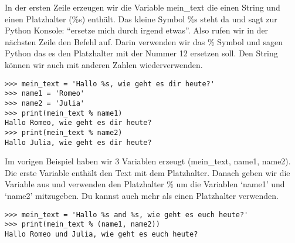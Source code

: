 In der ersten Zeile erzeugen wir die Variable mein\_text die einen String und einen Platzhalter (\%s) enthält. Das kleine Symbol \%s steht da und sagt zur Python Konsole: ``ersetze mich durch irgend etwas''. Also rufen wir in der nächsten Zeile den  Befehl auf. Darin verwenden wir das \% Symbol und sagen Python das es den Platzhalter mit der Nummer 12 ersetzen soll. Den String können wir auch mit anderen Zahlen wiederverwenden.

\begin{Verbatim}[frame=single]
>>> mein_text = 'Hallo %s, wie geht es dir heute?'
>>> name1 = 'Romeo'
>>> name2 = 'Julia'
>>> print(mein_text % name1)
Hallo Romeo, wie geht es dir heute?
>>> print(mein_text % name2)
Hallo Julia, wie geht es dir heute?
\end{Verbatim}

Im vorigen Beispiel haben wir 3 Variablen erzeugt (mein\_text, name1, name2). Die erste Variable enthält den Text mit dem Platzhalter. Danach geben wir die Variable aus und verwenden den Platzhalter \% um die Variablen `name1' und `name2' mitzugeben. Du kannst auch mehr als einen Platzhalter verwenden.

\begin{Verbatim}[frame=single]
>>> mein_text = 'Hallo %s and %s, wie geht es euch heute?'
>>> print(mein_text % (name1, name2))
Hallo Romeo und Julia, wie geht es euch heute?
\end{Verbatim}

